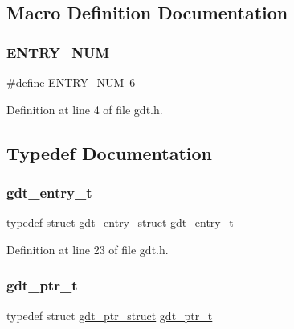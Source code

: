 \subsection{Macro Definition Documentation}
\mbox{\label{a00104_abe29d44fbb5292a15af80cbb8e8a3a7d_abe29d44fbb5292a15af80cbb8e8a3a7d}} 
\subsubsection{\texorpdfstring{E\+N\+T\+R\+Y\+\_\+\+N\+UM}{ENTRY\_NUM}}
{\footnotesize\ttfamily \#define E\+N\+T\+R\+Y\+\_\+\+N\+UM~6}



Definition at line 4 of file gdt.\+h.



\subsection{Typedef Documentation}
\mbox{\label{a00104_ab0b5c60e06a63669c783705278ff641e_ab0b5c60e06a63669c783705278ff641e}} 
\subsubsection{\texorpdfstring{gdt\+\_\+entry\+\_\+t}{gdt\_entry\_t}}
{\footnotesize\ttfamily typedef struct \hyperlink{a00236}{gdt\+\_\+entry\+\_\+struct} \hyperlink{a00104_ab0b5c60e06a63669c783705278ff641e_ab0b5c60e06a63669c783705278ff641e}{gdt\+\_\+entry\+\_\+t}}



Definition at line 23 of file gdt.\+h.

\mbox{\label{a00104_a3bf3fa6f397bda8399e1afb6283b66ca_a3bf3fa6f397bda8399e1afb6283b66ca}} 
\subsubsection{\texorpdfstring{gdt\+\_\+ptr\+\_\+t}{gdt\_ptr\_t}}
{\footnotesize\ttfamily typedef struct \hyperlink{a00232}{gdt\+\_\+ptr\+\_\+struct} \hyperlink{a00104_a3bf3fa6f397bda8399e1afb6283b66ca_a3bf3fa6f397bda8399e1afb6283b66ca}{gdt\+\_\+ptr\+\_\+t}}



